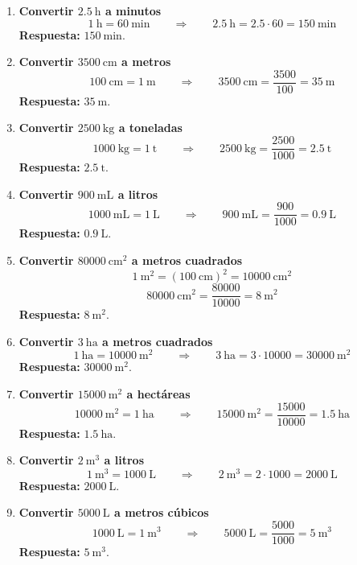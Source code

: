 \documentclass[12pt]{article}
\begin{document}
\begin{enumerate}[itemsep=0.45cm]
		\item \textbf{Convertir $2.5\ \text{h}$ a minutos}
		\[
		1\ \text{h}=60\ \text{min}
		\qquad\Rightarrow\qquad
		2.5\ \text{h}=2.5\cdot 60=150\ \text{min}
		\]
		\textbf{Respuesta:} $150\ \text{min}$.
		
		\item \textbf{Convertir $3500\ \text{cm}$ a metros}
		\[
		100\ \text{cm}=1\ \text{m}
		\qquad\Rightarrow\qquad
		3500\ \text{cm}=\frac{3500}{100}=35\ \text{m}
		\]
		\textbf{Respuesta:} $35\ \text{m}$.
		
		\item \textbf{Convertir $2500\ \text{kg}$ a toneladas}
		\[
		1000\ \text{kg}=1\ \text{t}
		\qquad\Rightarrow\qquad
		2500\ \text{kg}=\frac{2500}{1000}=2.5\ \text{t}
		\]
		\textbf{Respuesta:} $2.5\ \text{t}$.
		
		\item \textbf{Convertir $900\ \text{mL}$ a litros}
		\[
		1000\ \text{mL}=1\ \text{L}
		\qquad\Rightarrow\qquad
		900\ \text{mL}=\frac{900}{1000}=0.9\ \text{L}
		\]
		\textbf{Respuesta:} $0.9\ \text{L}$.
		
		\item \textbf{Convertir $80000\ \text{cm}^2$ a metros cuadrados}
		\[
		1\ \text{m}^2=(100\ \text{cm})^2=10000\ \text{cm}^2
		\]
		\[
		80000\ \text{cm}^2=\frac{80000}{10000}=8\ \text{m}^2
		\]
		\textbf{Respuesta:} $8\ \text{m}^2$.
		
		\item \textbf{Convertir $3\ \text{ha}$ a metros cuadrados}
		\[
		1\ \text{ha}=10000\ \text{m}^2
		\qquad\Rightarrow\qquad
		3\ \text{ha}=3\cdot10000=30000\ \text{m}^2
		\]
		\textbf{Respuesta:} $30000\ \text{m}^2$.
		
		\item \textbf{Convertir $15000\ \text{m}^2$ a hectáreas}
		\[
		10000\ \text{m}^2=1\ \text{ha}
		\qquad\Rightarrow\qquad
		15000\ \text{m}^2=\frac{15000}{10000}=1.5\ \text{ha}
		\]
		\textbf{Respuesta:} $1.5\ \text{ha}$.
		
		\item \textbf{Convertir $2\ \text{m}^3$ a litros}
		\[
		1\ \text{m}^3=1000\ \text{L}
		\qquad\Rightarrow\qquad
		2\ \text{m}^3=2\cdot1000=2000\ \text{L}
		\]
		\textbf{Respuesta:} $2000\ \text{L}$.
		
		\item \textbf{Convertir $5000\ \text{L}$ a metros cúbicos}
		\[
		1000\ \text{L}=1\ \text{m}^3
		\qquad\Rightarrow\qquad
		5000\ \text{L}=\frac{5000}{1000}=5\ \text{m}^3
		\]
		\textbf{Respuesta:} $5\ \text{m}^3$.
	\end{enumerate}
	
\end{document}
